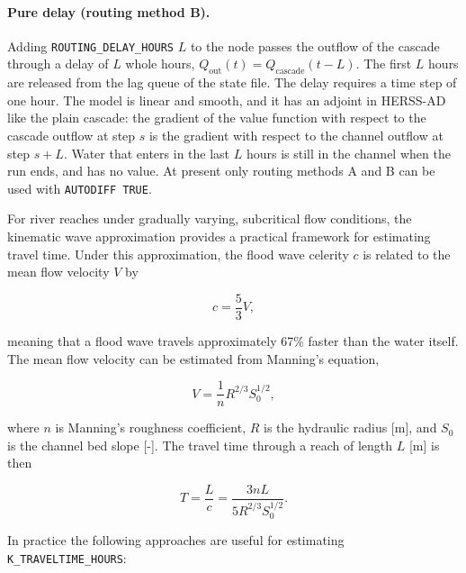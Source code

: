 \documentclass[a4paper, 12pt]{report}
\begin{document}
	\paragraph{Pure delay (routing method B).} Adding \texttt{ROUTING\_DELAY\_HOURS} $L$ to the node
	passes the outflow of the cascade through a delay of $L$ whole hours, $Q_\mathrm{out}(t) = Q_\mathrm{cascade}(t-L)$.
	The first $L$ hours are released from the lag queue of the state file. The delay requires a time step of one hour.
	The model is linear and smooth, and it has an adjoint in HERSS-AD like the plain cascade: the gradient of the value
	function with respect to the cascade outflow at step $s$ is the gradient with respect to the channel outflow at step $s+L$.
	Water that enters in the last $L$ hours is still in the channel when the run ends, and has no value.
	At present only routing methods A and B can be used with \texttt{AUTODIFF TRUE}.

	For river reaches under gradually varying, subcritical flow conditions, the kinematic
	wave approximation provides a practical framework for estimating travel time.
	Under this approximation, the flood wave celerity $c$ is related to the mean flow
	velocity $V$ by
	
	\begin{equation}
		c = \frac{5}{3} V,
	\end{equation}
	
	meaning that a flood wave travels approximately 67\% faster than the water itself.
	The mean flow velocity can be estimated from Manning's equation,
	
	\begin{equation}
		V = \frac{1}{n} R^{2/3} S_0^{1/2},
	\end{equation}
	
	where $n$ is Manning's roughness coefficient, $R$ is the hydraulic radius [m], and
	$S_0$ is the channel bed slope [-]. The travel time through a reach of length $L$ [m]
	is then
	
	\begin{equation}
		T = \frac{L}{c} = \frac{3nL}{5 R^{2/3} S_0^{1/2}}.
	\end{equation}
	
	\noindent In practice the following approaches are useful for estimating
	\texttt{K\_TRAVELTIME\_HOURS}:
	
\end{document}
